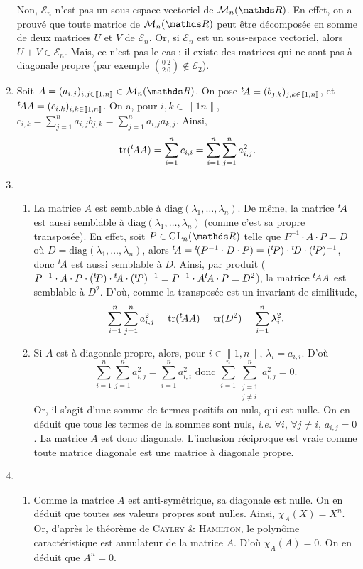 \documentclass[a4paper]{article}
\begin{document}
\begin{enumerate}
			Non, $\mathcal{E}_n$\/ n'est pas un sous-espace vectoriel de $\mathcal{M}_n(\R)$. En effet, on a prouvé que toute matrice de $\mathcal{M}_n(\R)$\/ peut être décomposée en somme de deux matrices $U$\/ et $V$\/ de $\mathcal{E}_n$. Or, si $\mathcal{E}_n$\/ est un sous-espace vectoriel, alors $U + V \in \mathcal{E}_n$. Mais, ce n'est pas le cas : il existe des matrices qui ne sont pas à diagonale propre (par exemple ${0\:2\choose 2\:0} \not\in \mathcal{E}_2$).
		\item Soit $A = (a_{i,j})_{i,j \in \left\llbracket 1,n \right\rrbracket} \in \mathcal{M}_n(\R)$. On pose ${}^t\! A = (b_{j,k})_{j,k\in\left\llbracket 1,n \right\rrbracket}$, et ${}^t\! A A = (c_{i,k})_{i,k\in\left\llbracket 1,n \right\rrbracket}$. On a, pour $i,k \in \left\llbracket 1n \right\rrbracket$, $c_{i,k} = \sum_{j=1}^n a_{i,j}b_{j,k} = \sum_{j=1}^n a_{i,j}a_{k,j}$. Ainsi, \[
				\operatorname{tr} ({}^t\! AA) = \sum_{i=1}^n c_{i,i} = \sum_{i=1}^n \sum_{j=1}^n a_{i,j}^2
			.\]
		\item
			\begin{enumerate}
				\item La matrice $A$\/ est semblable à $\mathrm{diag}(\lambda_1, \ldots, \lambda_n)$. De même, la matrice ${}^t\! A$\/ est aussi semblable à $\mathrm{diag}(\lambda_1, \ldots, \lambda_n)$\/ (comme c'est sa propre transposée). En effet, soit $P \in \mathrm{GL}_n(\R)$\/ telle que $P^{-1} \cdot A \cdot P = D$\/ où $D = \mathrm{diag}(\lambda_1, \ldots, \lambda_n)$, alors ${}^t\! A = {}^t\! (P^{-1} \cdot D \cdot P) = ({}^t\! P) \cdot {{}^t\!D} \cdot ({}^t\! P)^{-1}$, donc ${}^t\! A$\/ est aussi semblable à $D$. Ainsi, par produit ($P^{-1} \cdot A \cdot P \cdot ({}^t\! P) \cdot {{}^t\!A} \cdot ({}^t\! P) ^{-1} = P^{-1} \cdot A {}^t\! A \cdot P = D^2$), la matrice ${}^t\! A A$\/ est semblable à $D^2$. D'où, comme la transposée est un invariant de similitude, \[
						\sum_{i=1}^n\sum_{j=1}^n a_{i,j}^2 = \operatorname{tr}({}^t\! AA) = \operatorname{tr}(D^2) = \sum_{i=1}^n \lambda_i^2
					.\]
				\item Si $A$\/ est à diagonale propre, alors, pour $i \in \left\llbracket 1,n \right\rrbracket$, $\lambda_i = a_{i,i}$. D'où \[
					\sum_{i=1}^n \sum_{j=1}^n a_{i,j}^2 = \sum_{i=1}^n a_{i,i}^2 \text{ donc } \sum_{i=1}^n \sum_{\substack{j=1\\j\neq i}}^n a_{i,j}^2 = 0
				.\] Or, il s'agit d'une somme de termes positifs ou nuls, qui est nulle. On en déduit que tous les termes de la sommes sont nuls, \textit{i.e.} $\forall i$, $\forall j \neq i$, $a_{i,j} = 0$. La matrice $A$\/ est donc diagonale. L'inclusion réciproque est vraie comme toute matrice diagonale est une matrice à diagonale propre.
			\end{enumerate}
		\item
			\begin{enumerate}
				\item Comme la matrice $A$\/ est anti-symétrique, sa diagonale est nulle. On en déduit que toutes ses valeurs propres sont nulles. Ainsi, $\chi_A(X) = X^n$. Or, d'après le théorème de \textsc{Cayley} \& \textsc{Hamilton}, le polynôme caractéristique est annulateur de la matrice $A$. D'où $\chi_A(A) = 0$. On en déduit que $A^n = 0$.


\end{enumerate}
\end{enumerate}
\end{document}
